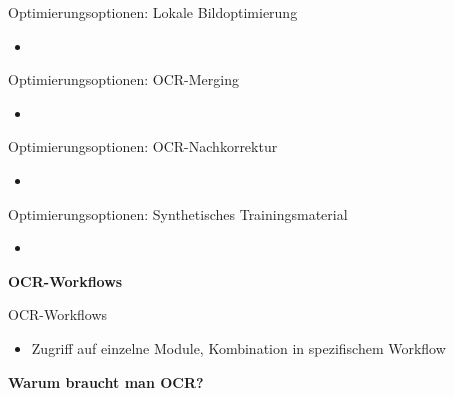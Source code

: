 \documentclass{bbawslides}
\begin{document}
\begin{bbawslide}{Optimierungsoptionen: Lokale Bildoptimierung}
  \vspace*{7mm}%
  \centerslidestrue%
  \begin{itemize}
    \item
  \end{itemize}
\end{bbawslide}

\begin{bbawslide}{Optimierungsoptionen: OCR-Merging}
  \vspace*{7mm}%
  \centerslidestrue%
  \begin{itemize}
    \item
  \end{itemize}
\end{bbawslide}

\begin{bbawslide}{Optimierungsoptionen: OCR-Nachkorrektur}
  \vspace*{7mm}%
  \centerslidestrue%
  \begin{itemize}
    \item
  \end{itemize}
\end{bbawslide}

\begin{bbawslide}{Optimierungsoptionen: Synthetisches Trainingsmaterial}
  \vspace*{7mm}%
  \centerslidestrue%
  \begin{itemize}
    \item
  \end{itemize}
\end{bbawslide}

\begin{bbawpart}{\Large\bf OCR-Workflows}
\end{bbawpart}

\begin{bbawslide}{OCR-Workflows}
  \vspace*{7mm}%
  \centerslidestrue%
  \begin{itemize}
    \item Zugriff auf einzelne Module, Kombination in spezifischem Workflow
  \end{itemize}
\end{bbawslide}

\begin{bbawpart}{\Large\bf Warum braucht man OCR?}
\end{bbawpart}
\end{document}
